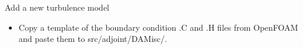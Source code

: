 \documentclass{bredelebeamer}
\begin{document}
\begin{frame}[fragile]{Add a new turbulence model}

\begin{itemize}
  \item Copy a template of the boundary condition .C and .H files from OpenFOAM and paste them to src/adjoint/DAMisc/.
\end{itemize}

\end{frame}
\end{document}
